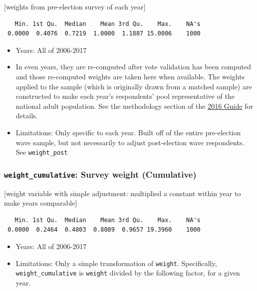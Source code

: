 \documentclass[10pt,article,oneside]{memoir}
\theoremstyle{definition}
\begin{document}
{[}weights from pre-election survey of each year{]}

\begin{verbatim}
   Min. 1st Qu.  Median    Mean 3rd Qu.    Max.    NA's 
 0.0000  0.4076  0.7219  1.0000  1.1887 15.0006    1000 
\end{verbatim}

\begin{itemize}
\tightlist
\item
  Years: All of 2006-2017
\item
  In even years, they are re-computed after vote validation has been
  computed and those re-computed weights are taken here when available.
  The weights applied to the sample (which is originally drawn from a
  matched sample) are constructed to make each year's respondents' pool
  representative of the national adult population. See the methodology
  section of the
  \href{https://dataverse.harvard.edu/api/access/datafile/3047286}{2016
  Guide} for details.
\item
  Limitations: Only specific to each year. Built off of the entire
  pre-election wave sample, but not necessarily to adjust post-election
  wave respondents. See \texttt{weight\_post}
\end{itemize}

\hypertarget{weight_cumulative-survey-weight-cumulative}{%
\subsubsection{\texorpdfstring{\texttt{weight\_cumulative}: Survey
weight
(Cumulative)}{weight\_cumulative: Survey weight (Cumulative)}}\label{weight_cumulative-survey-weight-cumulative}}

{[}weight variable with simple adjustment: multiplied a constant within
year to make years comparable{]}

\begin{verbatim}
   Min. 1st Qu.  Median    Mean 3rd Qu.    Max.    NA's 
 0.0000  0.2464  0.4803  0.8089  0.9657 19.3960    1000 
\end{verbatim}

\begin{itemize}
\tightlist
\item
  Years: All of 2006-2017
\item
  Limitations: Only a simple transformation of \texttt{weight}.
  Specifically, \texttt{weight\_cumulative} is \texttt{weight} divided
  by the following factor, for a given year.
\end{itemize}
\end{document}
